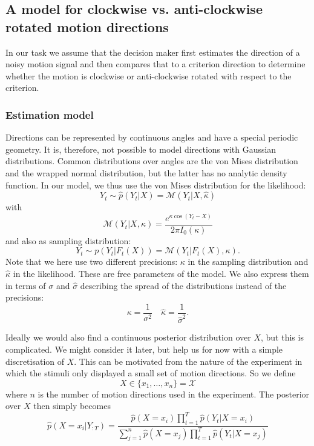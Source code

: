\documentclass[10pt,a4paper]{article}
\begin{document}
\subsection{A model for clockwise vs. anti-clockwise rotated motion directions}
In our task we assume that the decision maker first estimates the direction of a noisy motion signal and then compares that to a criterion direction to determine whether the motion is clockwise or anti-clockwise rotated with respect to the criterion. 

\subsubsection{Estimation model}
Directions can be represented by continuous angles and have a special periodic geometry. It is, therefore, not possible to model directions with Gaussian distributions. Common distributions over angles are the von Mises distribution and the wrapped normal distribution, but the latter has no analytic density function. In our model, we thus use the von Mises distribution for the likelihood:
\begin{equation}
Y_t \sim \hat{p}(Y_t | X) = \mathcal{M}(Y_t | X, \hat{\kappa})
\end{equation}
with
\begin{equation}
\mathcal{M}(Y_t | X, \kappa) = \frac{e^{\kappa \cos(Y_t - X)}}{2\pi I_0(\kappa)}
\end{equation}
and also as sampling distribution:
\begin{equation}
Y_t \sim p(Y_t | F_t(X)) = \mathcal{M}(Y_t | F_t(X), \kappa).
\end{equation}
Note that we here use two different precisions: $\kappa$ in the sampling distribution and $\hat{\kappa}$ in the likelihood. These are free parameters of the model. We also express them in terms of $\sigma$ and $\hat{\sigma}$ describing the spread of the distributions instead of the precisions:
\begin{equation}
\kappa = \frac{1}{\sigma^2} \quad \hat{\kappa} = \frac{1}{\hat{\sigma}^2}.
\end{equation}

Ideally we would also find a continuous posterior distribution over $X$, but this is complicated. We might consider it later, but help us for now with a simple discretisation of $X$. This can be motivated from the nature of the experiment in which the stimuli only displayed a small set of motion directions. So we define
\begin{equation}
X \in \{x_1, \dots, x_n\} = \mathcal{X}
\end{equation}
where $n$ is the number of motion directions used in the experiment. The posterior over $X$ then simply becomes
\begin{equation}\label{eq:caposterior}
\hat{p}(X=x_i | Y_{:T}) = \frac{\hat{p}(X=x_i)\prod_{t=1}^T \hat{p}(Y_t | X=x_i)}{\sum_{j=1}^n \hat{p}(X=x_j)\prod_{t=1}^T \hat{p}(Y_t | X=x_j)}
\end{equation}
\end{document}

